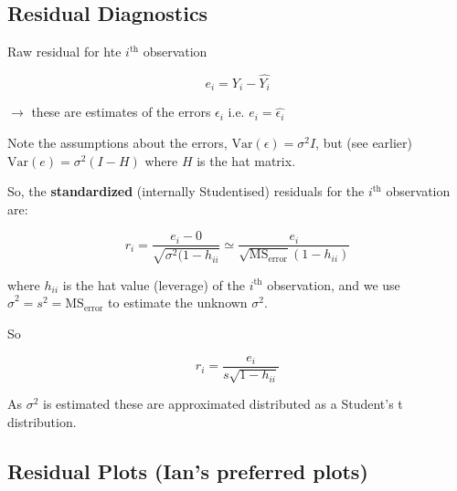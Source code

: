 \documentclass[a4paper, 11pt, twoside]{article}
\begin{document}
\subsection{Residual Diagnostics}

Raw residual for hte $i^{\text{th}}$ observation

\[e_i = Y_i - \hat{Y_i}\]

$\rightarrow$ these are estimates of the errors $\epsilon_i$ i.e. $e_i=\hat{\epsilon_i}$

Note the assumptions about the errors, $\text{Var}(\epsilon)=\sigma^2I$, but (see earlier) $\text{Var}(e)=\sigma^2(I-H)$ where $H$ is the hat matrix.

So, the \textbf{standardized} (internally Studentised) residuals for the $i^{\text{th}}$ observation are:

\[r_i=\frac{e_i-0}{\sqrt{\sigma^2(1-h_{ii}}}\simeq\frac{e_i}{\sqrt{\text{MS}_{\text{error}}}(1-h_{ii})}\]

where $h_{ii}$ is the hat value (leverage) of the $i^{\text{th}}$ observation, and we use $\hat{\sigma}^2=s^2=\text{MS}_{\text{error}}$ to estimate the unknown $\sigma^2$.

So

\[r_i=\frac{e_i}{s\sqrt{1-h_{ii}}}\]

As $\sigma^2$ is estimated these are approximated distributed as a Student's t distribution.

\subsection{Residual Plots (Ian's preferred plots)}
\end{document}
